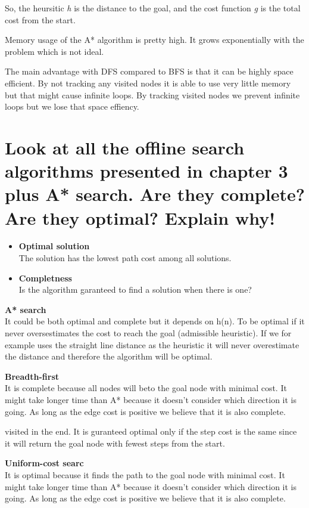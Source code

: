 \documentclass{article}
\begin{document}
So, the heursitic \textit{h} is the distance to the goal, and the cost function \textit{g} is the total cost from the start.

Memory usage of the A* algorithm is pretty high. It grows exponentially with the problem which is not ideal.

The main advantage with DFS compared to BFS is that it can be highly space efficient.
By not tracking any visited nodes it is able to use very little memory but that might cause infinite loops.
By tracking visited nodes we prevent infinite loops but we lose that space effiency.

\section*{Look at all the offline search algorithms presented in chapter 3 plus A* search. Are they complete? Are they optimal? Explain why!}

\begin{itemize}
	\item \textbf{Optimal solution} \\
	The solution has the lowest path cost among all solutions.
	\item \textbf{Completness} \\
	Is the algorithm garanteed to find a solution when there is one?
\end{itemize}

\textbf{A* search}\\
It could be both optimal and complete but it depends on h(n). To be optimal if it never oversestimates the cost to reach the goal (admissible heuristic).
If we for example uses the straight line distance as the heuristic it will never overestimate the distance and therefore the algorithm will be optimal. 

\textbf{Breadth-first}\\
It is complete because all nodes will beto the goal node with minimal cost. It might take longer time than A* because it doesn't consider which direction
it is going. As long as the edge cost is positive we believe that it is also complete. 

 visited in the end. It is guranteed optimal only if the step cost is the same since it will return the goal node
with fewest steps from the start.

\textbf{Uniform-cost searc}\\
It is optimal because it finds the path to the goal node with minimal cost. It might take longer time than A* because it doesn't consider which direction
it is going. As long as the edge cost is positive we believe that it is also complete. 
\end{document}

